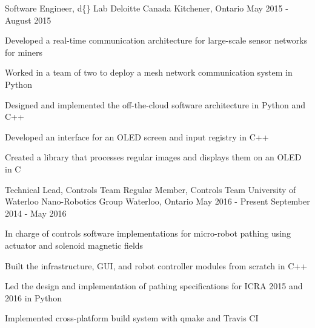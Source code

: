 \begin{cventries}

\cventry
{Software Engineer, d\{\} Lab}
{Deloitte Canada} %
{Kitchener, Ontario} %
{May 2015 - August 2015} %
{
Developed a real-time communication architecture for large-scale sensor networks for miners
\begin{cvitems}
\item[]
\item {Worked in a team of two to deploy a mesh network communication system in Python}
\item {Designed and implemented the off-the-cloud software architecture in Python and C++}
\item {Developed an interface for an OLED screen and input registry in C++}
\item {Created a library that processes regular images and displays them on an OLED in C}
\end{cvitems}
}


\cventry
{Technical Lead, Controls Team
Regular Member, Controls Team}
{University of Waterloo Nano-Robotics Group}
{Waterloo, Ontario}
{May 2016 - Present
September 2014 - May 2016} %
{ %
In charge of controls software implementations for micro-robot pathing using actuator and solenoid magnetic fields
\begin{cvitems}
\item[]
\item {Built the infrastructure, GUI, and robot controller modules from scratch in C++}
\item {Led the design and implementation of pathing specifications for ICRA 2015 and 2016 in Python}
\item {Implemented cross-platform build system with qmake and Travis CI}
\end{cvitems} 
}


\end{cventries}
